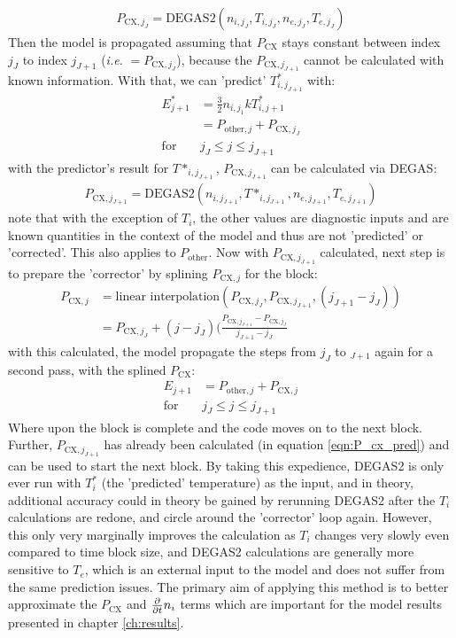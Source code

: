 \begin{align}
    P_{\text{CX},{j_J}} = \text{DEGAS2}(n_{i,j_J},T_{i,j_J}, n_{e,j_J}, T_{e,j_J})
\end{align}
Then the model is propagated assuming that $P_{\text{CX}}$ stays constant between index $j_J$ to index $j_{J+1}$ (\textit{i.e. }$ = P_{\text{CX}, j_J}$), because the $P_{\text{CX}, j_{J+1}}$ cannot be calculated with known information. With that, we can 'predict' $T^*_{i,j_{J+1}}$ with:
\begin{align}
    E^*_{j+1} & = \frac{3}{2}n_{i,j_1}kT_{i,j+1}^*\\
    & = P_{\text{other}, j} + P_{\text{CX}, j_J}\\
    \text{for } &j_J \leq j \leq j_{J+1}
\end{align}
with the predictor's result for $T*_{i, j_{J+1}}$, $P_{\text{CX}, j_{J+1}}$ can be calculated via DEGAS:
\begin{align}
    P_{\text{CX},{j_{J+1}}} = \text{DEGAS2}(n_{i,j_{J+1}},T*_{i,j_{J+1}}, n_{e,j_{J+1}}, T_{e,j_{J+1}})\label{eqn:P_cx_pred}
\end{align}
note that with the exception of $T_i$, the other values are diagnostic inputs and are known quantities in the context of the model and thus are not 'predicted' or 'corrected'. This also applies to $P_{\text{other}}$. Now with $P_{\text{CX}, j_{J+1}}$ calculated, next step is to prepare the 'corrector' by splining $P_{\text{CX}, j}$ for the block:
\begin{align}
    P_{\text{CX}, j} &= \text{linear interpolation}(P_{\text{CX},{j_J}}, P_{\text{CX}, j_{J+1}}, (j_{J+1} - j_J) )\\
    &= P_{\text{CX},{j_J}} + (j - j_J)(\frac{P_{\text{CX}, j_{J+1}} - P_{\text{CX},{j_J}}}{j_{J+1} - j_J}
\end{align}
with this calculated, the model propagate the steps from $j_J$ to $_{J+1}$ again for a second pass, with the splined $P_{\text{CX}}$:
\begin{align}
    E_{j+1} & = P_{\text{other}, j} + P_{\text{CX}, j}\\
    \text{for } &j_J \leq j \leq j_{J+1}
\end{align}
Where upon the block is complete and the code moves on to the next block. Further, $P_{\text{CX},{j_{J+1}}}$ has already been calculated (in equation \ref{eqn:P_cx_pred}) and can be used to start the next block. By taking this expedience, DEGAS2 is only ever run with $T_i^*$ (the 'predicted' temperature) as the input, and in theory, additional accuracy could in theory be gained by rerunning DEGAS2 after the $T_i$ calculations are redone, and circle around the 'corrector' loop again. However, this only very marginally improves the calculation as $T_i$ changes very slowly even compared to time block size, and DEGAS2 calculations are generally more sensitive to $T_e$, which is an external input to the model and does not suffer from the same prediction issues. The primary aim of applying this method is to better approximate the $P_\text{CX}$ and $\frac{\partial}{\partial t} n_i$ terms which are important for the model results presented in chapter \ref{ch:results}.
